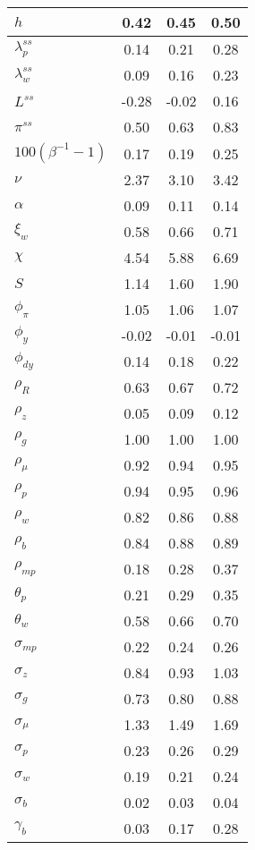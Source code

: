 \begin{tabular}{|l|c|c|c|}
\textbf{$h$}&0.42&0.45&0.50\\\hline
\textbf{$\lambda_p^{ss}$}&0.14&0.21&0.28\\\hline
\textbf{$\lambda_w^{ss}$}&0.09&0.16&0.23\\\hline
\textbf{$L^{ss}$}&-0.28&-0.02&0.16\\\hline
\textbf{$\pi^{ss}$}&0.50&0.63&0.83\\\hline
\textbf{$100 (\beta^{-1}-1)$}&0.17&0.19&0.25\\\hline
\textbf{$\nu$}&2.37&3.10&3.42\\\hline
\textbf{$\alpha$}&0.09&0.11&0.14\\\hline
\textbf{$\xi_w$}&0.58&0.66&0.71\\\hline
\textbf{$\chi$}&4.54&5.88&6.69\\\hline
\textbf{$S$}&1.14&1.60&1.90\\\hline
\textbf{$\phi_{\pi}$}&1.05&1.06&1.07\\\hline
\textbf{$\phi_{y}$}&-0.02&-0.01&-0.01\\\hline
\textbf{$\phi_{dy}$}&0.14&0.18&0.22\\\hline
\textbf{$\rho_R$}&0.63&0.67&0.72\\\hline
\textbf{$\rho_z$}&0.05&0.09&0.12\\\hline
\textbf{$\rho_g$}&1.00&1.00&1.00\\\hline
\textbf{$\rho_{\mu}$}&0.92&0.94&0.95\\\hline
\textbf{$\rho_{p}$}&0.94&0.95&0.96\\\hline
\textbf{$\rho_{w}$}&0.82&0.86&0.88\\\hline
\textbf{$\rho_b$}&0.84&0.88&0.89\\\hline
\textbf{$\rho_{mp}$}&0.18&0.28&0.37\\\hline
\textbf{$\theta_p$}&0.21&0.29&0.35\\\hline
\textbf{$\theta_w$}&0.58&0.66&0.70\\\hline
\textbf{$\sigma_{mp}$}&0.22&0.24&0.26\\\hline
\textbf{$\sigma_{z}$}&0.84&0.93&1.03\\\hline
\textbf{$\sigma_{g}$}&0.73&0.80&0.88\\\hline
\textbf{$\sigma_{\mu}$}&1.33&1.49&1.69\\\hline
\textbf{$\sigma_{p}$}&0.23&0.26&0.29\\\hline
\textbf{$\sigma_{w}$}&0.19&0.21&0.24\\\hline
\textbf{$\sigma_{b}$}&0.02&0.03&0.04\\\hline
\textbf{$\gamma_b$}&0.03&0.17&0.28\\\hline

\end{tabular}
